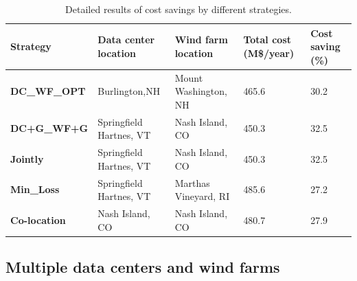 \begin{table}[ht]
\begin{center}
\caption{Detailed results of cost savings by different strategies.}
\begin{tabular}{|l|p{50pt}|p{50pt}|p{30pt}|p{20pt}|}
\hline
\textbf{Strategy}& \textbf{Data center location} &\textbf{Wind farm location} &\textbf{Total cost (M\$/year)} &\textbf{Cost saving (\%)} \\
\hline
\textbf{DC\_WF\_OPT} &  Burlington,NH  & Mount Washington, NH &465.6& 30.2 \\
\textbf{DC+G\_WF+G} &Springfield Hartnes, VT  & Nash Island, CO&450.3& 32.5\\
\textbf{Jointly} &Springfield Hartnes, VT&  Nash Island, CO & 450.3 & 32.5\\
\textbf{Min\_Loss} &Springfield Hartnes, VT & Marthas Vineyard, RI & 485.6& 27.2 \\
\textbf{Co-location}& Nash Island, CO &Nash Island, CO&480.7 & 27.9  \\
\hline
\end{tabular}
\label{tab:costsaving}
\end{center}
\end{table}

\subsection{Multiple data centers and wind farms}


